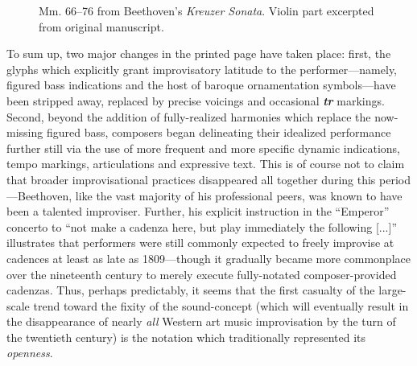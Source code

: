     
        \begin{figure}
            \centering
            \captionsetup{width=.5\textwidth}
            \caption[Mm. 66--76 from Beethoven's \textit{Kreuzer Sonata}. Violin part excerpted from original manuscript.]{Mm. 66--76 from Beethoven's \textit{Kreuzer Sonata}. Violin part excerpted from original manuscript.\footnotemark}
            \label{fig:beethoven}
        \end{figure}

    To sum up, two major changes in the printed page have taken place: first, the glyphs which explicitly grant improvisatory latitude to the performer---namely, figured bass indications and the host of baroque ornamentation symbols---have been stripped away, replaced by precise voicings and occasional \textbf{\textit{tr}} markings. Second, beyond the addition of fully-realized harmonies which replace the now-missing figured bass, composers began delineating their idealized performance further still via the use of more frequent and more specific dynamic indications, tempo markings, articulations and expressive text. This is of course not to claim that broader improvisational practices disappeared all together during this period---Beethoven, like the vast majority of his professional peers, was known to have been a talented improviser.\autocite[652--3]{Taruskin_2009b} Further, his explicit instruction in the ``Emperor'' concerto to ``not make a cadenza here, but play immediately the following [...]'' illustrates that performers were still commonly expected to freely improvise at cadences at least as late as 1809---though it gradually became more commonplace over the nineteenth century to merely execute fully-notated composer-provided cadenzas.\autocite[45]{Swain_1988} Thus, perhaps predictably, it seems that the first casualty of the large-scale trend toward the fixity of the sound-concept (which will eventually result in the disappearance of nearly \textit{all} Western art music improvisation by the turn of the twentieth century) is the notation which traditionally represented its \textit{openness}.
    

